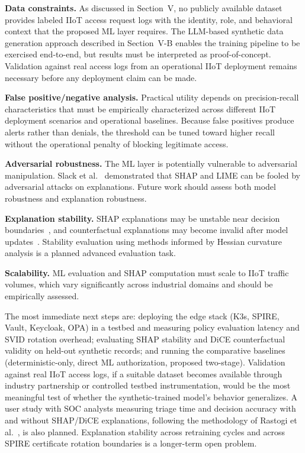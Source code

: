\documentclass[conference]{IEEEtran}
\begin{document}
\textbf{Data constraints.} As discussed in Section~V, no publicly available dataset provides labeled IIoT access request logs with the identity, role, and behavioral context that the proposed ML layer requires. The LLM-based synthetic data generation approach described in Section~V-B enables the training pipeline to be exercised end-to-end, but results must be interpreted as proof-of-concept. Validation against real access logs from an operational IIoT deployment remains necessary before any deployment claim can be made.

\textbf{False positive/negative analysis.} Practical utility depends on precision-recall characteristics that must be empirically characterized across different IIoT deployment scenarios and operational baselines. Because false positives produce alerts rather than denials, the threshold can be tuned toward higher recall without the operational penalty of blocking legitimate access.

\textbf{Adversarial robustness.} The ML layer is potentially vulnerable to adversarial manipulation. Slack et al.~\cite{slack2020} demonstrated that SHAP and LIME can be fooled by adversarial attacks on explanations. Future work should assess both model robustness and explanation robustness.

\textbf{Explanation stability.} SHAP explanations may be unstable near decision boundaries~\cite{alvarez2018}, and counterfactual explanations may become invalid after model updates~\cite{jiang2024}. Stability evaluation using methods informed by Hessian curvature analysis is a planned advanced evaluation task.

\textbf{Scalability.} ML evaluation and SHAP computation must scale to IIoT traffic volumes, which vary significantly across industrial domains and should be empirically assessed.

The most immediate next steps are: deploying the edge stack (K3s, SPIRE, Vault, Keycloak, OPA) in a testbed and measuring policy evaluation latency and SVID rotation overhead; evaluating SHAP stability and DiCE counterfactual validity on held-out synthetic records; and running the comparative baselines (deterministic-only, direct ML authorization, proposed two-stage). Validation against real IIoT access logs, if a suitable dataset becomes available through industry partnership or controlled testbed instrumentation, would be the most meaningful test of whether the synthetic-trained model's behavior generalizes. A user study with SOC analysts measuring triage time and decision accuracy with and without SHAP/DiCE explanations, following the methodology of Rastogi et al.~\cite{rastogi2025}, is also planned. Explanation stability across retraining cycles and across SPIRE certificate rotation boundaries is a longer-term open problem.
\end{document}
